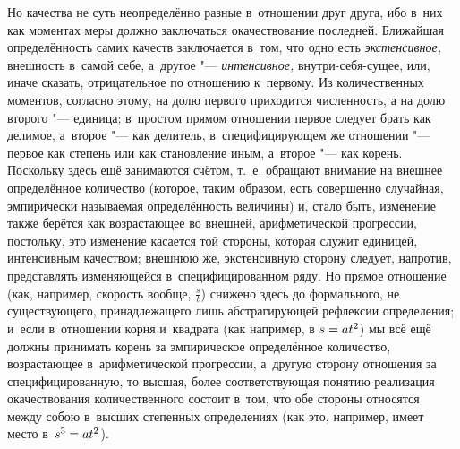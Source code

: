 Но качества не суть неопределённо разные в~отношении друг друга, ибо в~них как
моментах меры должно заключаться окачествование последней. Ближайшая
определённость самих качеств заключается в~том, что одно есть
{\em экстенсивное,} внешность в~самой себе, а~другое "--- {\em интенсивное,}
внутри-себя-сущее, или, иначе сказать, отрицательное по отношению к~первому. Из
количественных моментов, согласно этому, на долю первого приходится численность,
а на долю второго "--- единица; в~простом прямом отношении первое следует
брать как делимое, а~второе "--- как делитель, в~специфицирующем же отношении
"--- первое как степень или как становление иным, а~второе "--- как корень.
Поскольку здесь ещё занимаются счётом, т.~е. обращают внимание на внешнее
определённое количество (которое, таким образом, есть совершенно случайная,
эмпирически называемая определённость величины) и, стало быть, изменение также
берётся как возрастающее во внешней, арифметической прогрессии, постольку,
это изменение касается той стороны, которая служит единицей, интенсивным
качеством; внешнюю же, экстенсивную сторону следует, напротив, представлять
изменяющейся в~специфицированном ряду. Но прямое отношение (как, например,
скорость вообще, $\frac s t$) снижено здесь до формального, не существующего,
принадлежащего лишь абстрагирующей рефлексии определения; и~если в~отношении
корня и~квадрата (как например, в $s\hm=at^2$) мы всё ещё должны принимать
корень за эмпирическое определённое количество, возрастающее в~арифметической
прогрессии, а~другую сторону отношения за специфицированную, то высшая, более
соответствующая понятию реализация окачествования количественного состоит
в~том, что обе стороны относятся между собою в~высших степенн\'{ы}х
определениях (как это, например, имеет место в~$s^3\hm=at^2$).

\subsubremark{}

